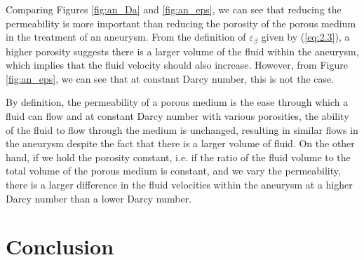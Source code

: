 \documentclass[a4paper, 11pt]{report}
\begin{document}
Comparing Figures \ref{fig:an_Da} and \ref{fig:an_eps}, we can see that reducing the permeability is more important than reducing the porosity of the porous medium in the treatment of an aneurysm. From the definition of $\varepsilon_\beta$ given by (\ref{eq:2.3}), a higher porosity suggests there is a larger volume of the fluid within the aneurysm, which implies that the fluid velocity should also increase. However, from Figure \ref{fig:an_eps}, we can see that at constant Darcy number, this is not the case. 

By definition, the permeability of a porous medium is the ease through which a fluid can flow and at constant Darcy number with various porosities, the ability of the fluid to flow through the medium is unchanged, resulting in similar flows in the aneurysm despite the fact that there is a larger volume of fluid. On the other hand, if we hold the porosity constant, i.e. if the ratio of the fluid volume to the total volume of the porous medium is constant, and we vary the permeability, there is a larger difference in the fluid velocities within the aneurysm at a higher Darcy number than a lower Darcy number. 




\chapter{Conclusion}

\end{document}
